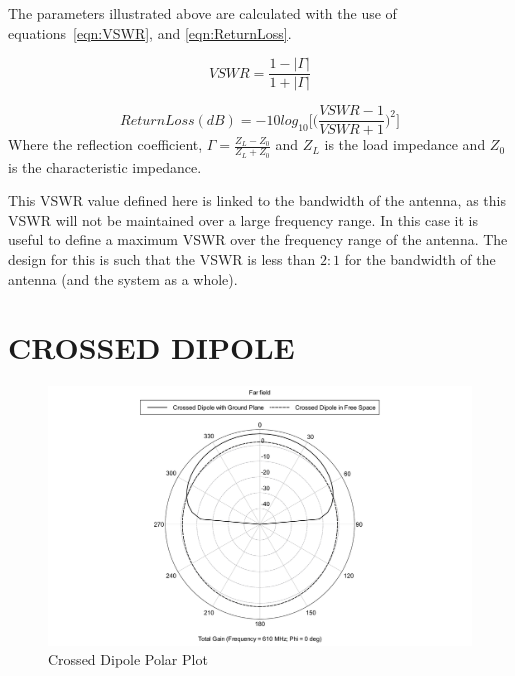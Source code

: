 \documentclass[11pt]{witseiepaper}
\begin{document}
\begin{bibunit}[witseie]
The parameters illustrated above are calculated with the use of equations~\ref{eqn:VSWR}, and \ref{eqn:ReturnLoss}.


\begin{equation} \label{eqn:VSWR}
VSWR = \frac{1 - |\Gamma|}{1 + |\Gamma|}
\end{equation}

\begin{equation} \label{eqn:ReturnLoss}
Return Loss (dB) = -10 log_{10} \Bigg[ \Big(\frac{VSWR - 1}{VSWR + 1} \Big)^2 \Bigg]
\end{equation}
Where the reflection coefficient, $\Gamma = \frac{Z_L - Z_0}{Z_L + Z_0}$ and $Z_L$ is the load impedance and $Z_0$ is the characteristic impedance.

This VSWR value defined here is linked to the bandwidth of the antenna, as this VSWR will not be maintained over a large frequency range. In this case it is useful to define a maximum VSWR over the frequency range of the antenna. The design for this is such that the VSWR is less than $2:1$ for the bandwidth of the antenna (and the system as a whole).

\section{CROSSED DIPOLE} \label{sec:Crossed-Dipole}

\begin{figure}[htb]
    \centering
    \includegraphics[width=\linewidth]{Crossed-Dipole-Polar.pdf}
    \caption{Crossed Dipole Polar Plot}
    \label{fig:Crossed-Dipole-Radiation-Patterns-Polar}
\end{figure}



\end{bibunit}
\end{document}
